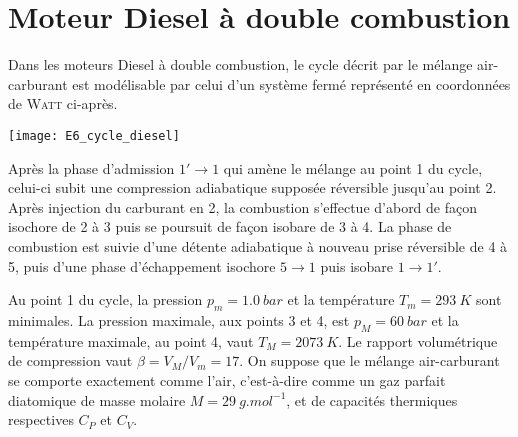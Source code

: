 \documentclass[../TDT5.tex]{subfiles}%
\begin{document}
\section{Moteur Diesel à double combustion}
Dans les moteurs Diesel à double combustion, le cycle décrit par le mélange
air-carburant est modélisable par celui d’un système fermé représenté en
coordonnées de \textsc{Watt} ci-après.
\smallbreak
\noindent
\begin{minipage}[c]{.25\linewidth}
	\begin{center}
		\texttt{[image: E6\_cycle\_diesel]}
	\end{center}
\end{minipage}
\hfill
\noindent
\begin{minipage}[c]{.70\linewidth}
	Après la phase d’admission $1' \to 1$ qui amène le mélange au point 1 du
	cycle, celui-ci subit une compression adiabatique supposée réversible jusqu’au
	point 2. Après injection du carburant en 2, la combustion s’effectue d’abord
	de façon isochore de 2 à 3 puis se poursuit de façon isobare de 3 à 4. La
	phase de combustion est suivie d’une détente adiabatique à nouveau prise
	réversible de 4 à 5, puis d’une phase d’échappement isochore $5 \to 1$ puis
	isobare $1 \to 1'$.
\end{minipage}
Au point 1 du cycle, la pression $p_m = \SI{1.0}{bar}$ et la température $T_m =
	\SI{293}{K}$ sont minimales. La pression maximale, aux points 3 et 4, est $p_M =
	\SI{60}{bar}$ et la température maximale, au point 4, vaut $T_M =
	\SI{2073}{K}$. Le rapport volumétrique de compression vaut $\beta = V_M/V_m =
	\num{17}$.
\smallbreak
On suppose que le mélange air-carburant se comporte exactement comme l'air,
c'est-à-dire comme un gaz parfait diatomique de masse molaire $M =
	\SI{29}{g.mol^{-1}}$, et de capacités thermiques respectives $C_P$ et $C_V$.
%
%
%
%
%
\end{document}
